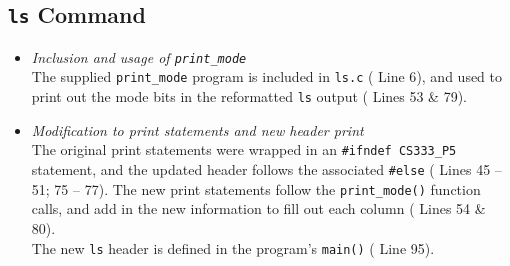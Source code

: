 \documentclass[11pt,letterpaper]{report}
\begin{document}
	\subsection{{\tt ls} Command}
	\begin{itemize}
		\item \emph{Inclusion and usage of {\tt print\_mode}}\\
		The supplied {\tt print\_mode} program is included in {\tt ls.c} ({\color{red} Line 6}), and used to print out the mode bits in the reformatted {\tt ls} output ({\color{red} Lines 53 \& 79}).
		
		\item \emph{Modification to print statements and new header print}\\
		The original print statements were wrapped in an {\tt \#ifndef CS333\_P5} statement, and the updated header follows the associated {\tt \#else} ({\color{red} Lines 45 -- 51; 75 -- 77}). The new print statements follow the {\tt print\_mode()} function calls, and add in the new information to fill out each column ({\color{red} Lines 54 \& 80}).\\
		The new {\tt ls} header is defined in the program's {\tt main()} ({\color{red} Line 95}).
		
	\end{itemize}
	
\end{document}
